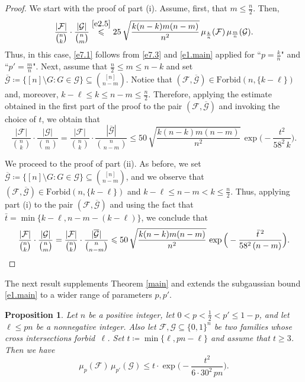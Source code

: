 \documentclass[10pt,a4paper]{amsart}
\newtheorem{prop}[thm]{Proposition}
\theoremstyle{remark}
\newcommand{\meg}{\geqslant}
\newcommand{\mik}{\leqslant}
\newcommand{\Fcal}{\mathcal{F}}
\newcommand{\Gcal}{\mathcal{G}}
\begin{document}
\begin{proof}
We start with the proof of part (i). Assume, first, that $m\mik \frac{n}{2}$. Then,
\begin{equation} \label{e7.3}
\frac{|\Fcal|}{\binom{n}{k}}\cdot \frac{|\Gcal|}{\binom{n}{m}}
\stackrel{\eqref{e2.5}}{\mik} 25\, \sqrt{\frac{k(n-k)m(n-m)}{n^2}}\,
\mu_{\frac{k}{n}}(\Fcal)\, \mu_{\frac{m}{n}}(\Gcal).
\end{equation}
Thus, in this case, \eqref{e7.1} follows from \eqref{e7.3} and \eqref{e1.main} applied
for ``$p=\frac{k}{n}$" and ``$p'=\frac{m}{n}$". Next, assume that $\frac{n}{2}\mik m\mik n-k$
and set $\overline{\Gcal}\coloneqq \{[n]\setminus G: G\in\Gcal\} \subseteq \binom{[n]}{n-m}$.
Notice that $(\Fcal,\overline{\Gcal})\in\mathrm{Forbid}(n,\{k-\ell\})$ and, moreover,
$k-\ell \mik k \mik n-m \mik\frac{n}{2}$. Therefore, applying the estimate obtained in the
first part of the proof to the pair $(\Fcal,\overline{\Gcal})$ and invoking the choice of $t$,
we obtain that
\begin{equation} \label{e7.4}
\frac{|\Fcal|}{\binom{n}{k}}\cdot \frac{|\Gcal|}{\binom{n}{m}} =
\frac{|\Fcal|}{\binom{n}{k}}\cdot \frac{|\overline{\Gcal}|}{\binom{n}{n-m}}
\mik 50\, \sqrt{\frac{k(n-k)m(n-m)}{n^2}}\, \exp\Big(-\frac{t^2}{58^2\, k}\Big).
\end{equation}

We proceed to the proof of part (ii). As before, we set
$\overline{\Gcal}\coloneqq \{[n]\setminus G:G\in\Gcal\}\subseteq \binom{[n]}{n-m}$, and we observe that
$(\Fcal,\overline{\Gcal})\in\mathrm{Forbid}(n,\{k-\ell\})$ and $k-\ell\mik n-m < k\mik\frac{n}{2}$.
Thus, applying part (i) to the pair $(\Fcal,\overline{\Gcal})$ and using the fact that
$\bar{t}=\min\{k-\ell,n-m-(k-\ell)\}$, we conclude that
\begin{equation} \label{e7.5}
\frac{|\Fcal|}{\binom{n}{k}}\cdot \frac{|\Gcal|}{\binom{n}{m}} =
\frac{|\Fcal|}{\binom{n}{k}}\cdot \frac{|\overline{\Gcal}|}{\binom{n}{n-m}}
\mik 50\, \sqrt{\frac{k(n-k)m(n-m)}{n^2}}\, \exp\Big(-\frac{\bar{t}^{\, 2}}{58^2\,(n-m)}\Big). \qedhere
\end{equation}
\end{proof}
The next result supplements Theorem \ref{main} and extends the subgaussian bound \eqref{e1.main}
to a wider range of parameters $p,p'$.
\begin{prop} \label{p7.2}
Let $n$ be a positive integer, let $0<p<\frac12 < p'\mik 1-p$, and let $\ell\mik pn$ be a nonnegative integer.
Also let $\Fcal,\Gcal\subseteq \{0,1\}^n$ be two families whose cross intersections forbid\, $\ell$.
Set $t\coloneqq \min\{\ell,pn-\ell\}$ and assume that $t\meg 3$. Then we have
\begin{equation} \label{e7.6}
\mu_p(\Fcal)\, \mu_{p'}(\Gcal) \mik t\cdot\exp\Big( - \frac{t^2}{6\cdot 30^2\, pn}\Big).
\end{equation}
\end{prop}
\end{document}

